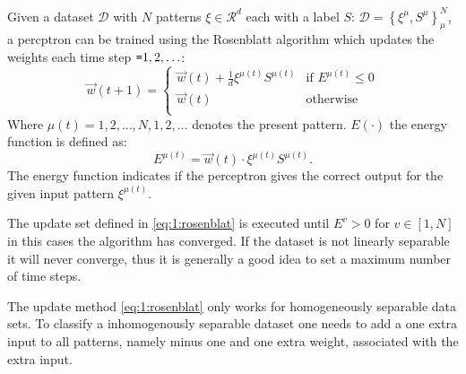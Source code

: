 Given a dataset $\mathcal{D}$ with $N$ patterns $\xi \in \mathcal{R}^d$ each with a label $S$: $\mathcal{D} = \left\{\xi^\mu, S^\mu \right\}_{\mu}^{N}$, a percptron can be trained using the Rosenblatt algorithm which updates the weights each time step $\texttt{=} 1, 2, \ldots$:
	\begin{equation}\label{eq:1:rosenblat}
		\vec{w}(t+1) = 
		\begin{cases}
		\vec{w}(t) + \frac{1}{d} \xi^{\mu(t)} S^{\mu(t)}
		& \text{if } E^{\mu(t)} \leq 0\\
		\vec{w}(t) 											
		& \text{otherwise}\\
		\end{cases}
	\end{equation}
Where $\mu(t) = 1, 2, \ldots, N, 1, 2, \ldots$ denotes the present pattern. $E(\cdot)$ the energy function is defined as:
	\begin{equation}\label{eq:1:energyFunction}
		E^{\mu(t)} = \vec{w}(t) \cdot \xi^{\mu(t)}S^{\mu(t)}.
	\end{equation}
The energy function indicates if the perceptron gives the correct output for the given input pattern $\xi^{\mu(t)}$. 

The update set defined in \autoref{eq:1:rosenblat} is executed until $E^v > 0$ for $v \in [1, N]$ in this cases the algorithm has converged. If the dataset is not linearly separable it will never converge, thus it is generally a good idea to set a maximum number of time steps. 

The update method \eqref{eq:1:rosenblat} only works for homogeneously separable data sets. To classify a inhomogenously separable dataset one needs to add a one extra input to all patterns, namely minus one and one extra weight, associated with the extra input.


